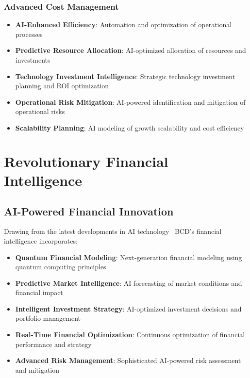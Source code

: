 \documentclass[12pt,a4paper]{book}
\begin{document}
\subsubsection{Advanced Cost Management}

\begin{itemize}
    \item \textbf{AI-Enhanced Efficiency}: Automation and optimization of operational processes
    \item \textbf{Predictive Resource Allocation}: AI-optimized allocation of resources and investments
    \item \textbf{Technology Investment Intelligence}: Strategic technology investment planning and ROI optimization
    \item \textbf{Operational Risk Mitigation}: AI-powered identification and mitigation of operational risks
    \item \textbf{Scalability Planning}: AI modeling of growth scalability and cost efficiency
\end{itemize}

\section{Revolutionary Financial Intelligence}

\subsection{AI-Powered Financial Innovation}

Drawing from the latest developments in AI technology \, BCD's financial intelligence incorporates:

\begin{itemize}
    \item \textbf{Quantum Financial Modeling}: Next-generation financial modeling using quantum computing principles
    \item \textbf{Predictive Market Intelligence}: AI forecasting of market conditions and financial impact
    \item \textbf{Intelligent Investment Strategy}: AI-optimized investment decisions and portfolio management
    \item \textbf{Real-Time Financial Optimization}: Continuous optimization of financial performance and strategy
    \item \textbf{Advanced Risk Management}: Sophisticated AI-powered risk assessment and mitigation
\end{itemize}
\end{document}
